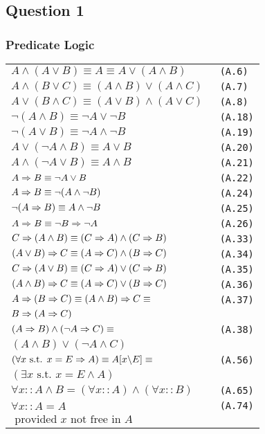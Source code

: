 \subsection{Question 1}

\subsubsection{Predicate Logic}
\setlength{\tabcolsep}{0pt} 
\begin{tabular}{@{}ll@{}}
$ A \land (A \lor B) \equiv A \equiv A \lor (A \land B)$ & \verb! (A.6)! \\
$ A \land (B \lor C) \equiv (A \land B) \lor (A \land C)$ & \verb! (A.7)! \\
$ A \lor (B \land C) \equiv (A \lor B) \land (A \lor C)$ & \verb! (A.8)! \\
$ \neg (A \land B) \equiv \neg A \lor \neg B$ & \verb! (A.18)! \\
$ \neg (A \lor B) \equiv \neg A \land \neg B$ & \verb! (A.19)! \\
$ A \lor (\neg A \land B) \equiv A \lor B$ & \verb! (A.20)! \\
$ A \land (\neg A \lor B) \equiv A \land B$ & \verb! (A.21)! \\
$ A \Rightarrow B \equiv \neg A \lor B$ & \verb! (A.22)! \\
$ A \Rightarrow B \equiv \neg(A \land \neg B)$ & \verb! (A.24)! \\
$ \neg(A \Rightarrow B) \equiv A \land \neg B$ & \verb! (A.25)! \\
$ A \Rightarrow B \equiv \neg B \Rightarrow \neg A$ & \verb! (A.26)! \\
$ C \Rightarrow (A \land B) \equiv (C \Rightarrow A) \land (C \Rightarrow B)$ & \verb! (A.33)! \\
$ (A \lor B) \Rightarrow C \equiv (A \Rightarrow C) \land (B \Rightarrow C)$ & \verb! (A.34)! \\
$ C \Rightarrow (A \lor B) \equiv (C \Rightarrow A) \lor (C \Rightarrow B)$ & \verb! (A.35)! \\
$ (A \land B) \Rightarrow C \equiv (A \Rightarrow C) \lor (B \Rightarrow C)$ & \verb! (A.36)! \\
$ A \Rightarrow (B \Rightarrow C) \equiv (A \land B) \Rightarrow C \equiv$ & \verb! (A.37)! \\
$ B \Rightarrow (A \Rightarrow C)$ & \\
$ (A \Rightarrow B) \land (\neg A \Rightarrow C) \equiv$ & \verb! (A.38)! \\
$ (A \land B) \lor (\neg A \land C)$ & \\
$ (\forall x \text{ s.t. } x = E \Rightarrow A) \equiv A[x \backslash E] \equiv $ & \verb! (A.56)! \\
$ (\exists x \text{ s.t. } x = E \land A)$ & \\
$ \forall x :: A \land B = (\forall x :: A) \land (\forall x :: B)$ & \verb! (A.65)! \\
$ \forall x :: A = A$ & \verb! (A.74)! \\
$ \text{ provided } x \text{ not free in } A$ & \\
\end{tabular}

